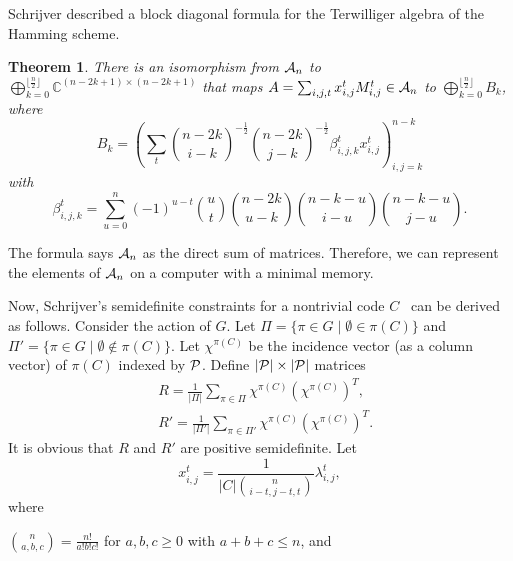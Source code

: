 \documentclass[final,onecolumn]{IEEEtran}
\newtheorem{theoremenv}[definitionenv]{Theorem}
\newenvironment{theorem}{\begin{theoremenv}\rm}{\end{theoremenv}}
\theoremstyle{definition}
\begin{document}
Schrijver described a block diagonal formula for the Terwilliger algebra of the Hamming scheme. 
\begin{theorem} \cite[Theorem 1]{Sch05} \label{thm:ter_blo}
	There is an isomorphism from ${\cal A}_{n}$ to $\bigoplus_{k = 0}^{\lfloor \frac{n}{2} \rfloor} \mathbb{C}^{(n-2k+1) \times (n-2k+1)}$ that maps $A = \sum_{i, j, t}x_{i, j}^{t}M_{i, j}^{t} \in {\cal A}_{n}$ to $\bigoplus_{k = 0}^{\lfloor \frac{n}{2} \rfloor} B_{k}$, where
	\begin{equation*}
		B_{k} = \left( \sum_{t} \binom{n-2k}{i-k}^{-\frac{1}{2}} \binom{n-2k}{j-k}^{-\frac{1}{2}} \beta_{i, j, k}^{t} x_{i, j}^{t} \right)_{i, j = k}^{n-k}
	\end{equation*}
	with
	\begin{equation*}
		\beta_{i, j, k}^{t} = \sum_{u = 0}^{n} (-1)^{u-t} \binom{u}{t} \binom{n-2k}{u-k}\binom{n-k-u}{i-u}\binom{n-k-u}{j-u}.
	\end{equation*}
\end{theorem}
The formula says ${\cal A}_{n}$ as the direct sum of matrices. Therefore, we can represent the elements of ${\cal A}_{n}$ on a computer with a minimal memory.
	
Now, Schrijver's semidefinite constraints for a nontrivial code $C$~\cite{Sch05}  can be derived as follows. Consider the action of $G$. Let $\Pi = \{\pi \in G \mid \emptyset \in \pi(C)\}$ and $\Pi' = \{\pi \in G \mid \emptyset \notin \pi(C)\}$. Let $\chi^{\pi(C)}$ be the incidence vector (as a column vector) of $\pi(C)$ indexed by ${\cal P}$. Define $ \lvert {\cal P} \rvert \times \lvert {\cal P} \rvert$ matrices
\begin{align*}
	&R = \frac{1}{\lvert \Pi \rvert} \sum_{\pi \in \Pi} \chi^{\pi(C)} (\chi^{\pi(C)})^{T}, \\
	&R' = \frac{1}{\lvert \Pi' \rvert} \sum_{\pi \in \Pi'} \chi^{\pi(C)} (\chi^{\pi(C)})^{T}.
\end{align*}
It is obvious that $R$ and $R'$ are positive semidefinite. Let
\begin{equation*}
	x_{i, j}^{t} = \frac{1}{\lvert C \rvert \binom{n}{i-t, j-t, t}} \lambda_{i, j}^{t},
\end{equation*}
where

$\binom{n}{a, b, c} = \frac{n!}{a!b!c!}$ for $a, b, c \geq 0$ with $a+b+c \leq n$, and
\end{document}
